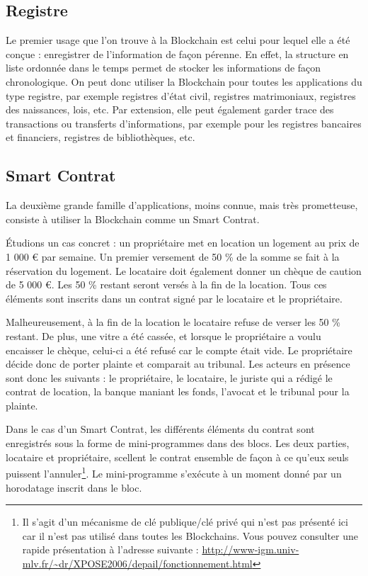 \documentclass{article}
\begin{document}
\subsection{Registre}

Le premier usage que l'on trouve à la Blockchain est celui pour lequel elle a été conçue : enregistrer de l'information de façon pérenne. En effet, la structure en liste ordonnée dans le temps permet de stocker les informations de façon chronologique. On peut donc utiliser la Blockchain pour toutes les applications du type registre, par exemple registres d'état civil, registres matrimoniaux, registres des naissances, lois, etc.
Par extension, elle peut également garder trace des transactions ou transferts d'informations, par exemple pour les registres bancaires et financiers, registres de bibliothèques, etc.


\subsection{Smart Contrat}

La deuxième grande famille d'applications, moins connue, mais très prometteuse, consiste à utiliser la Blockchain comme un Smart Contrat. 

Étudions un cas concret : un propriétaire met en location un logement au prix de 1 000 € par semaine. Un premier versement de 50 \% de la somme se fait à la réservation du logement. Le locataire doit également donner un chèque de caution de 5 000 €. Les 50 \% restant seront versés à la fin de la location. Tous ces éléments sont inscrits dans un contrat signé par le locataire et le propriétaire.

Malheureusement, à la fin de la location le locataire refuse de verser les 50 \% restant. De plus, une vitre a été cassée, et lorsque le propriétaire a voulu encaisser le chèque, celui-ci a été refusé car le compte était vide. Le propriétaire décide donc de porter plainte et comparait au tribunal. Les acteurs en présence sont donc les suivants : le propriétaire, le locataire, le juriste qui a rédigé le contrat de location, la banque maniant les fonds, l'avocat et le tribunal pour la plainte.

Dans le cas d'un Smart Contrat, les différents éléments du contrat sont enregistrés sous la forme de mini-programmes dans des blocs. Les deux parties, locataire et propriétaire, scellent le contrat ensemble de façon à ce qu’eux seuls puissent l'annuler\footnote{Il s'agit d'un mécanisme de clé publique/clé privé qui n'est pas présenté ici car il n'est pas utilisé dans toutes les Blockchains. Vous pouvez consulter une rapide présentation à l'adresse suivante : \url{http://www-igm.univ-mlv.fr/~dr/XPOSE2006/depail/fonctionnement.html}}. Le mini-programme s'exécute à un moment donné par un horodatage inscrit dans le bloc. 
\end{document}
